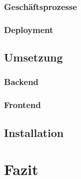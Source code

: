 \documentclass[10pt,a4paper]{report}
\begin{document}
  \subsection{Geschäftsprozesse}
  \subsection{Deployment}
  \section{Umsetzung}
  \subsection{Backend}
  \subsection{Frontend}
  \section{Installation}

  \chapter{Fazit}

\end{document}
